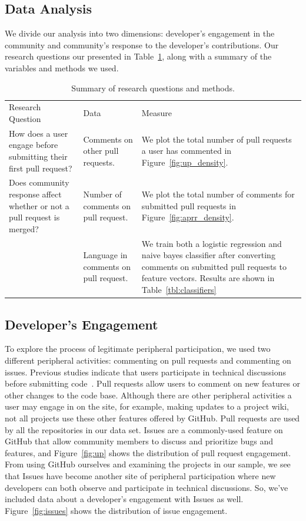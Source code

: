 \documentclass{sigchi}
\begin{document}
\subsection{Data Analysis} \label{sec:data_analysis}

We divide our analysis into two dimensions: developer's engagement in the community and
community's response to the developer's contributions. Our research questions our presented in
Table~\ref{tbl:research_questions}, along with a summary of the variables and
methods we used.

\begin{table}[ht] \centering
\caption{Summary of research questions and methods.}
\label{tbl:research_questions}
\begin{tabular}{ p{2.1in} p{2.1in} p{2.3in} }
\hline\hline
Research Question
& Data                                  & Measure
\\
How does a user engage before submitting their first pull request?
& Comments on other pull requests.      & We plot the total number
of pull requests a user has commented in
Figure~\ref{fig:up_density}.
\\
Does community response affect whether or not a pull request is
merged? & Number of comments on pull request.   & We plot the
total number of comments for submitted pull requests in
Figure~\ref{fig:aprr_density}.
\\
~
& Language in comments on pull request. & We train both a
logistic regression and naive bayes classifier after
converting comments on submitted pull requests to feature
vectors. Results are shown in
Table~\ref{tbl:classifiers} \\
\hline
\end{tabular}
\end{table}

\subsection{Developer's Engagement}
To explore the process of legitimate peripheral participation, we used two different peripheral activities: commenting on pull requests and commenting on issues. Previous studies indicate that users participate in technical
discussions before submitting code~\cite{von_krogh_community_2003}. Pull
requests allow users to comment on new features or other changes to the code
base. Although there are other peripheral activities a user may engage in on the
site, for example, making updates to a project wiki, not all projects use these
other features offered by GitHub. Pull requests are used by all the repositories
in our data set. Issues are a commonly-used feature on GitHub that
allow community members to discuss and prioritize bugs and features, and Figure~\ref{fig:up} shows the distribution of pull request engagement. From using GitHub ourselves and examining the projects in our sample, we see that Issues have become another site of peripheral participation where new developers can both observe and participate in technical discussions. So, we've included data about a developer's engagement with Issues as well. Figure~\ref{fig:issues} shows the distribution of issue engagement.
\end{document}
